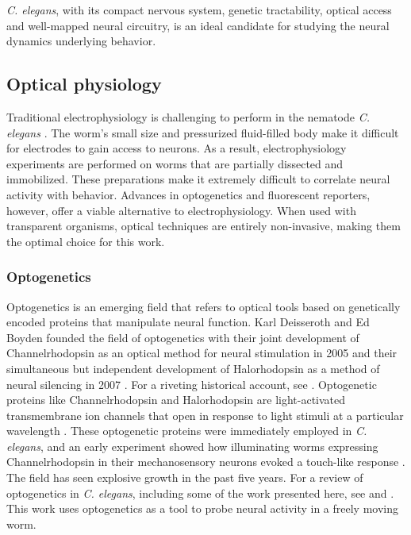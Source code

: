 \textit{C. elegans}, with its compact nervous system, genetic tractability,  optical access and well-mapped neural circuitry, is an ideal candidate for studying the neural dynamics underlying behavior.

\subsection{Optical physiology}
Traditional electrophysiology is challenging to perform in the nematode \textit{C. elegans} \citep{goodman_active_1998, schafer_neurophysiological_2006}. The worm's small size and pressurized fluid-filled body make it difficult for electrodes to gain access to neurons.  As a result, electrophysiology experiments are  performed on worms that are partially dissected and immobilized. These preparations make it extremely difficult to correlate neural activity with behavior.  Advances in optogenetics and fluorescent reporters, however,  offer a viable alternative to electrophysiology. When used with transparent organisms, optical techniques are entirely non-invasive, making them the optimal choice for this work. 

\subsubsection{Optogenetics}
Optogenetics is an emerging field that refers to optical tools based on genetically encoded proteins that manipulate neural function. Karl Deisseroth and Ed Boyden founded the field of optogenetics with their joint development of Channelrhodopsin as an optical method for neural stimulation in  2005 \citep{boyden_millisecond-timescale_2005} and their simultaneous but independent development of Halorhodopsin as a method of neural silencing in 2007 \citep{zhang_multimodal_2007, han_multiple-color_2007}.  For a riveting historical account, see \citep{boyden_history_2011}. Optogenetic proteins like Channelrhodopsin and Halorhodopsin are light-activated transmembrane ion channels that open in response to light stimuli at a particular wavelength \citep{nagel_channelrhodopsin-2_2003, yizhar_optogenetics_2011, fenno_development_2011}. These optogenetic proteins were immediately employed  in \textit{C. elegans}, and an early experiment showed how illuminating worms expressing Channelrhodopsin in their mechanosensory neurons evoked a touch-like response  \citep{nagel_light_2005}.  The field has seen explosive growth in the past five years. For a review of optogenetics in \textit{C. elegans}, including some of the work presented here, see \citep{xu_early_2011} and \citep{yizhar_optogenetics_2011}. This work uses optogenetics as a tool to probe neural activity in a freely moving worm. 

